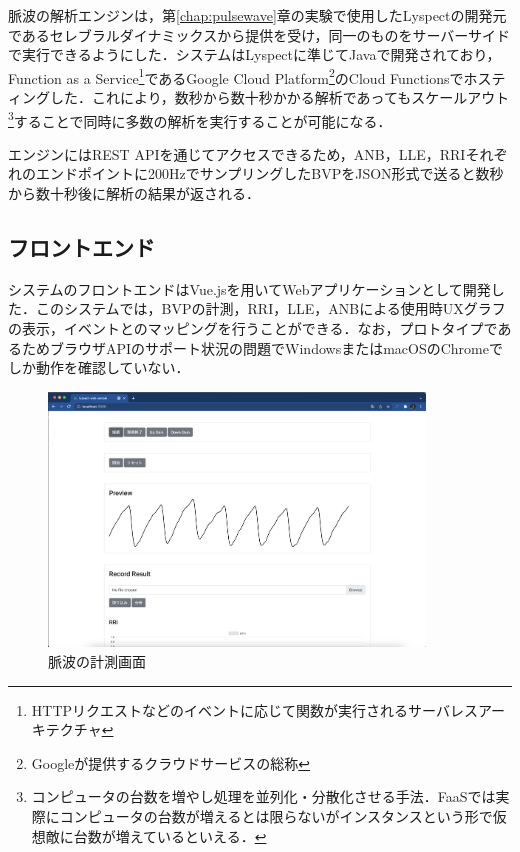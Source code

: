 脈波の解析エンジンは，第\ref{chap:pulsewave}章の実験で使用したLyspectの開発元であるセレブラルダイナミックスから提供を受け，同一のものをサーバーサイドで実行できるようにした．システムはLyspectに準じてJavaで開発されており，Function as a Service\footnote{HTTPリクエストなどのイベントに応じて関数が実行されるサーバレスアーキテクチャ}であるGoogle Cloud Platform\footnote{Googleが提供するクラウドサービスの総称}のCloud Functionsでホスティングした．これにより，数秒から数十秒かかる解析であってもスケールアウト\footnote{コンピュータの台数を増やし処理を並列化・分散化させる手法．FaaSでは実際にコンピュータの台数が増えるとは限らないがインスタンスという形で仮想敵に台数が増えているといえる．}することで同時に多数の解析を実行することが可能になる．

エンジンにはREST APIを通じてアクセスできるため，ANB，LLE，RRIそれぞれのエンドポイントに200HzでサンプリングしたBVPをJSON形式で送ると数秒から数十秒後に解析の結果が返される．

\subsection{フロントエンド}

システムのフロントエンドはVue.jsを用いてWebアプリケーションとして開発した．このシステムでは，BVPの計測，RRI，LLE，ANBによる使用時UXグラフの表示，イベントとのマッピングを行うことができる．なお，プロトタイプであるためブラウザAPIのサポート状況の問題でWindowsまたはmacOSのChromeでしか動作を確認していない．

\begin{figure}[htbp]
  \begin{minipage}{\hsize}
    \begin{center}
       \includegraphics[width=100mm]{img/pwm.png}
    \end{center}
    \caption{脈波の計測画面}
    \label{fig:majorment}
  \end{minipage}
\end{figure}

